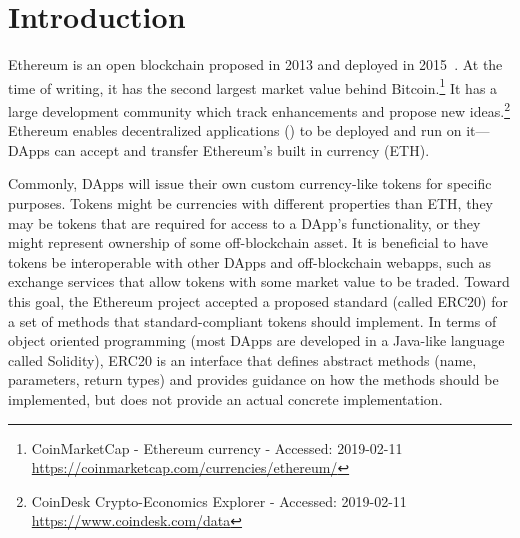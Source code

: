 
\section{Introduction}



Ethereum is an open blockchain proposed in 2013 and deployed in 2015~\cite{Ref00}. At the time of writing, it has the second largest market value behind Bitcoin.\footnote{CoinMarketCap - Ethereum currency - Accessed: 2019-02-11 \newline\url{https://coinmarketcap.com/currencies/ethereum/}} It has a large development community which track enhancements and propose new ideas.\footnote{CoinDesk Crypto-Economics Explorer - Accessed: 2019-02-11 \newline\url{https://www.coindesk.com/data}} Ethereum enables decentralized applications (\dapps) to be deployed and run on it---DApps can accept and transfer Ethereum's built in currency (ETH). 

Commonly, DApps will issue their own custom currency-like tokens for specific purposes. Tokens might be currencies with different properties than ETH, they may be tokens that are required for access to a DApp's functionality, or they might represent ownership of some off-blockchain asset. It is beneficial to have tokens be interoperable with other DApps and off-blockchain webapps, such as exchange services that allow tokens with some market value to be traded. Toward this goal, the Ethereum project accepted a proposed standard (called ERC20) for a set of methods that standard-compliant tokens should implement. In terms of object oriented programming (most DApps are developed in a Java-like language called Solidity), ERC20 is an interface that defines abstract methods (name, parameters, return types) and provides guidance on how the methods should be implemented, but does not provide an actual concrete implementation. 



